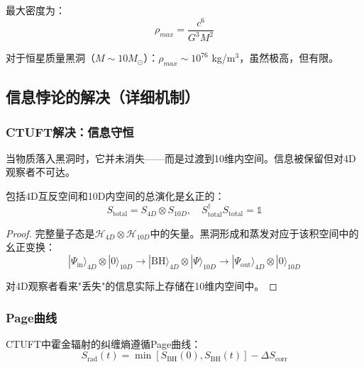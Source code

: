 最大密度为：
\begin{equation}
    \rho_{max} = \frac{c^6}{G^3M^2}
\end{equation}

对于恒星质量黑洞（$M \sim 10M_\odot$）：$\rho_{max} \sim 10^{76}$ kg/m$^3$，虽然极高，但有限。

\subsection{信息悖论的解决（详细机制）}

\subsubsection{CTUFT解决：信息守恒}

\begin{insight}[信息流向内空间]
当物质落入黑洞时，它并未消失——而是过渡到10维内空间。信息被保留但对4D观察者不可达。
\end{insight}

\begin{theorem}[CTUFT中的幺正演化]
包括4D互反空间和10D内空间的总演化是幺正的：
\begin{equation}
    S_{\text{total}} = S_{4D} \otimes S_{10D}, \quad S_{\text{total}}^\dagger S_{\text{total}} = \mathbb{1}
\end{equation}
\end{theorem}

\begin{proof}
完整量子态是$\mathcal{H}_{4D} \otimes \mathcal{H}_{10D}$中的矢量。黑洞形成和蒸发对应于该积空间中的幺正变换：
\begin{equation}
    |\Psi_{\text{in}}\rangle_{4D} \otimes |0\rangle_{10D} \to |\text{BH}\rangle_{4D} \otimes |\Psi\rangle_{10D} \to |\Psi_{\text{out}}\rangle_{4D} \otimes |0\rangle_{10D}
\end{equation}

对4D观察者看来"丢失"的信息实际上存储在10维内空间中。
\end{proof}

\subsubsection{Page曲线}

CTUFT中霍金辐射的纠缠熵遵循Page曲线：
\begin{equation}
    S_{\text{rad}}(t) = \min\left[S_{\text{BH}}(0), S_{\text{BH}}(t)\right] - \Delta S_{\text{corr}}
\end{equation}

